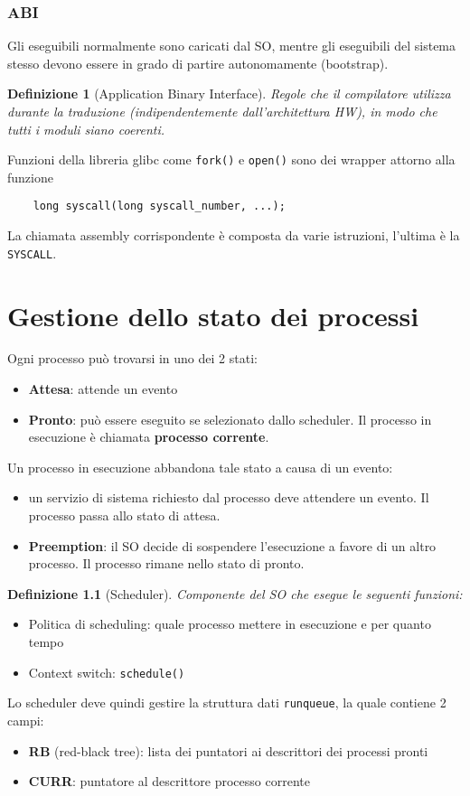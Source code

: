 \documentclass[12pt, a4paper]{report}
\newtheorem{definition}{Definizione}
\begin{document}
\subsection{ABI}
Gli eseguibili normalmente sono caricati dal SO, mentre gli eseguibili del
sistema stesso devono essere in grado di partire autonomamente (bootstrap).
\begin{definition}[Application Binary Interface]
	Regole che il compilatore utilizza durante la traduzione (indipendentemente
	dall'architettura HW), in modo che tutti i moduli siano coerenti.
\end{definition}
Funzioni della libreria glibc come \texttt{fork()} e \texttt{open()} sono dei
wrapper attorno alla funzione
\begin{verbatim}
	long syscall(long syscall_number, ...);
\end{verbatim}
La chiamata assembly corrispondente è composta da varie istruzioni, l'ultima è
la \texttt{SYSCALL}.

\chapter{Gestione dello stato dei processi}
Ogni processo può trovarsi in uno dei 2 stati:
\begin{itemize}
	\item \textbf{Attesa}: attende un evento
	\item \textbf{Pronto}: può essere eseguito se selezionato dallo scheduler.
		Il processo in esecuzione è chiamata \textbf{processo corrente}.
\end{itemize}
Un processo in esecuzione abbandona tale stato a causa di un evento:
\begin{itemize}
	\item un servizio di sistema richiesto dal processo deve attendere un
		evento. Il processo passa allo stato di attesa.
	\item \textbf{Preemption}: il SO decide di sospendere l'esecuzione a favore
		di un altro processo. Il processo rimane nello stato di pronto.
\end{itemize}
\begin{definition}[Scheduler]
	Componente del SO che esegue le seguenti funzioni:
\end{definition}
\begin{itemize}
	\item Politica di scheduling: quale processo mettere in esecuzione e per
		quanto tempo
	\item Context switch: \texttt{schedule()}
\end{itemize}
Lo scheduler deve quindi gestire la struttura dati \texttt{runqueue}, la quale
contiene 2 campi:
\begin{itemize}
	\item \textbf{RB} (red-black tree): lista dei puntatori ai descrittori dei
		processi pronti
	\item \textbf{CURR}: puntatore al descrittore processo corrente
\end{itemize}
\end{document}
